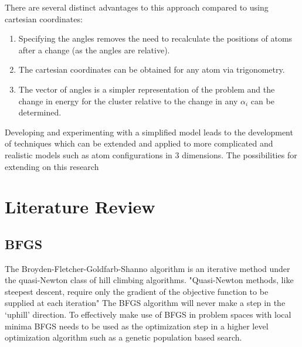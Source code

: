\documentclass[11pt]{article}
\begin{document}
    There are several distinct advantages to this approach compared to using cartesian coordinates:
    \begin{enumerate}
        \item Specifying the angles removes the need to recalculate the positions of atoms after a change (as the angles are relative).
        \item The cartesian coordinates can be obtained for any atom via trigonometry.
        \item The vector of angles is a simpler representation of the problem and the change in energy for the cluster relative to the change in any $\alpha_{i}$ can be determined.
    \end{enumerate}

    Developing and experimenting with a simplified model leads to the development of techniques which can be extended and applied to more complicated and realistic models such as atom configurations in 3 dimensions. The possibilities for extending on this research
    
    \section{Literature Review}
    \subsection{BFGS}
    The Broyden-Fletcher-Goldfarb-Shanno algorithm is an iterative method under the quasi-Newton class of hill climbing algorithms. "Quasi-Newton methods, like steepest descent, require only the gradient of the objective function to be supplied at each iteration" \cite{numericalOptimization} The BFGS algorithm will never make a step in the `uphill' direction. To effectively make use of BFGS in problem spaces with local minima BFGS needs to be used as the optimization step in a higher level optimization algorithm such as a genetic population based search.
\end{document}
